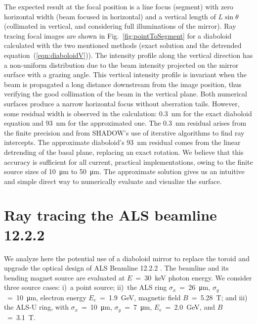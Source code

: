\documentclass[preprint]{iucr}       %
\newcommand{\inblue}[1]{{\color{blue}#1}}
\newcommand{\inred}[1]{{\color{red}#1}}
\begin{document}
The expected result at the focal position is a line focus (segment) \inblue{with zero horizontal width} \inred{(beam focused in horizontal)} \inblue{and a vertical length of $L\sin\theta$} \inred{(collimated in vertical, and considering full illuminations of the mirror)}. Ray tracing focal images are shown in Fig.~\ref{fig:pointToSegment} for a diaboloid calculated with the two mentioned methods (exact solution and the detrended equation~(\ref{eqn:diaboloidV})). The intensity profile along the vertical direction has a non-uniform distribution due to the beam intensity projected on the mirror surface with a grazing angle.
\inred{This vertical intensity profile is invariant when the beam is propagated a long distance downstream from the image position, thus verifying the good collimation of the beam in the vertical plane.} Both numerical surfaces produce a narrow horizontal focus without aberration tails. However, some residual width is observed in the calculation: \SI{0.3}{\nano\meter} for the exact diaboloid equation and \SI{93}{\nano\meter} for the approximated one. The \SI{0.3}{\nano\meter} residual arises from the finite precision and from SHADOW's use of iterative algorithms to find ray intercepts.
The approximate diaboloid's \SI{93}{\nano\meter} residual comes from the linear detrending of the basal plane, replacing an exact rotation. We believe that this accuracy is sufficient for all current, practical implementations, owing to the finite source sizes of \SI{10}{\micro\meter} to \SI{50}{\micro\meter}. The approximate solution gives us an intuitive and simple direct way to numerically evaluate and visualize the surface.

\section{Ray tracing the ALS beamline 12.2.2}
\label{sec:beamline}

We analyze here the potential use of a diaboloid mirror to replace the toroid and upgrade the optical design of ALS Beamline 12.2.2 \cite{bl1222,MacDowell2004}. The beamline and its bending magnet source are evaluated at $E$~=~\SI{30}{\kilo\electronvolt} photon energy. We consider three source cases: i)~a point source; ii)~the ALS ring
$\sigma_x$~=~\SI{26}{\micro\meter}, $\sigma_y$~=~\SI{10}{\micro\meter}, 
electron energy $E_e$~=~\SI{1.9}{\giga\electronvolt}, magnetic field $B$~=~\SI{5.28}{\tesla}; and iii) the ALS-U ring, with $\sigma_x$~=~\SI{10}{\micro\meter}, $\sigma_y$~=~\SI{7}{\micro\meter}, $E_e$~=~\SI{2.0}{\giga\electronvolt}, and $B$~=~\SI{3.1}{\tesla}. 
\end{document}
